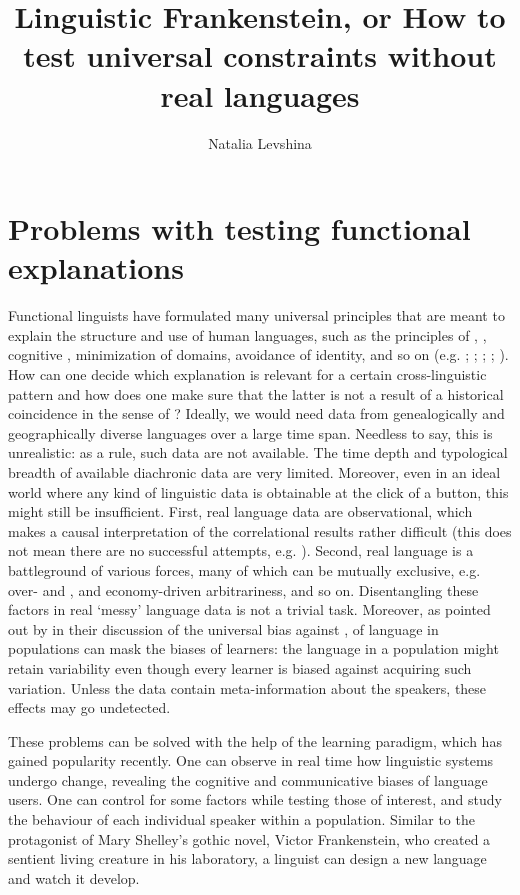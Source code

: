 \documentclass[output=paper]{langsci/langscibook}
\author{Natalia Levshina\affiliation{Leipzig University}}
\title{Linguistic {Frankenstein}, or {How} to test universal constraints without real languages}
\begin{document}
\maketitle 
 

\section{Problems with testing functional explanations}

Functional linguists have formulated many universal principles that are meant to explain the structure and use of human languages, such as the principles of , , cognitive , minimization of domains, avoidance of identity, and so on (e.g. \citealt{Haiman1983}; \citealt{Rohdenburg1996}; \citealt{Rohdenburg2003}; \citealt{Hawkins2004}; \citealt{Haspelmath2008_FreqIcon}). How can one decide which explanation is relevant for a certain cross-linguistic pattern and how does one make sure that the latter is not a result of a historical coincidence in the sense of ? Ideally, we would need data from genealogically and geographically diverse languages over a large time span. Needless to say, this is unrealistic: as a rule, such data are not available. The time depth and typological breadth of available diachronic data are very limited. Moreover, even in an ideal world where any kind of linguistic data is obtainable at the click of a button, this might still be insufficient. First, real language data are observational, which makes a causal interpretation of the correlational results rather difficult (this does not mean there are no successful attempts, e.g. \citealt{Prado2014}). Second, real language is a battleground of various forces, many of which can be mutually exclusive, e.g. over- and ,  and economy-driven arbitrariness, and so on. Disentangling these factors in real ‘messy’ language data is not a trivial task. Moreover, as pointed out by \citet{SmithEtAl2017} in their discussion of the universal bias against ,  of language in populations can mask the biases of learners: the language in a population might retain variability even though every learner is biased against acquiring such variation. Unless the data contain meta-information about the speakers, these effects may go undetected.

These problems can be solved with the help of the  learning paradigm, which has gained popularity recently. One can observe in real time how linguistic systems undergo change, revealing the cognitive and communicative biases of language users. One can control for some factors while testing those of interest, and study the behaviour of each individual speaker within a population. Similar to the protagonist of Mary Shelley’s gothic novel, Victor Frankenstein, who created a sentient living creature in his laboratory, a linguist can design a new language and watch it develop. 
\end{document}
